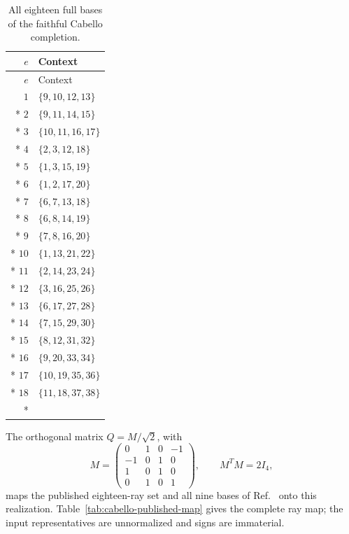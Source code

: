 \documentclass[aps,pra,reprint,superscriptaddress,longbibliography,nofootinbib,floatfix,10pt]{revtex4-2}
\theoremstyle{definition}
\begin{document}
\endgroup
\begingroup\small
{}
\begin{longtable}{rl}
\caption{All eighteen full bases of the faithful Cabello completion.}\label{tab:cabello36-contexts}\\
\toprule
$e$ & Context\\\midrule
\endfirsthead
\toprule
$e$ & Context\\\midrule
\endhead
\bottomrule\endfoot
$1$ & $\{9,10,12,13\}$\\*
$2$ & $\{9,11,14,15\}$\\*
$3$ & $\{10,11,16,17\}$\\*
$4$ & $\{2,3,12,18\}$\\*
$5$ & $\{1,3,15,19\}$\\*
$6$ & $\{1,2,17,20\}$\\*
$7$ & $\{6,7,13,18\}$\\*
$8$ & $\{6,8,14,19\}$\\*
$9$ & $\{7,8,16,20\}$\\*
$10$ & $\{1,13,21,22\}$\\*
$11$ & $\{2,14,23,24\}$\\*
$12$ & $\{3,16,25,26\}$\\*
$13$ & $\{6,17,27,28\}$\\*
$14$ & $\{7,15,29,30\}$\\*
$15$ & $\{8,12,31,32\}$\\*
$16$ & $\{9,20,33,34\}$\\*
$17$ & $\{10,19,35,36\}$\\*
$18$ & $\{11,18,37,38\}$\\*
\end{longtable}
\endgroup
The orthogonal matrix $Q=M/\sqrt2$, with
\begin{equation}\label{eq:cabello-published-map}
M=\begin{pmatrix}
0&1&0&-1\\-1&0&1&0\\1&0&1&0\\0&1&0&1
\end{pmatrix},\qquad M^TM=2I_4,
\end{equation}
maps the published eighteen-ray set and all nine bases of
Ref.~\cite[Eqs.~(1)--(9)]{cabello-96} onto this realization.
Table~\ref{tab:cabello-published-map} gives the complete ray map;
the input representatives are unnormalized and signs are immaterial.
\begingroup\small
{}
\end{document}
